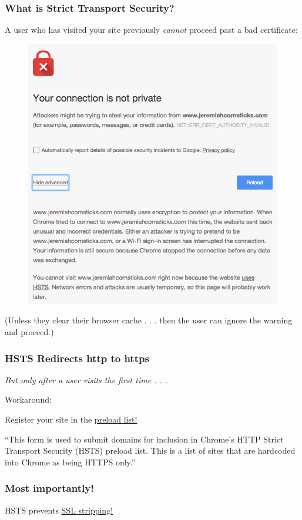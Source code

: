 \documentclass[9pt]{beamer}
\begin{document}
\begin{frame}[fragile]
\frametitle{What is Strict Transport Security?}
A user who has visited your site previously \emph{cannot} proceed past a bad certificate:
\begin{figure}
\includegraphics[scale=0.25]{figures/HSTSNoRedirect.png}
\end{figure}
(Unless they clear their browser cache . . . then the user can ignore the warning and proceed.)
\end{frame}

\begin{frame}[fragile]
\frametitle{HSTS Redirects http to https}
\emph{But only after a user visits the first time . . .}

Workaround:

Register your site in the \href{https://hstspreload.appspot.com/}{preload list!}

``This form is used to submit domains for inclusion in Chrome's HTTP Strict Transport Security (HSTS) preload list. This is a list of sites that are hardcoded into Chrome as being HTTPS only.''
\end{frame}

\begin{frame}[fragile]
\frametitle{Most importantly!}
HSTS prevents \href{http://www.thoughtcrime.org/software/sslstrip/}{SSL stripping!} 
\end{frame}
\end{document}
